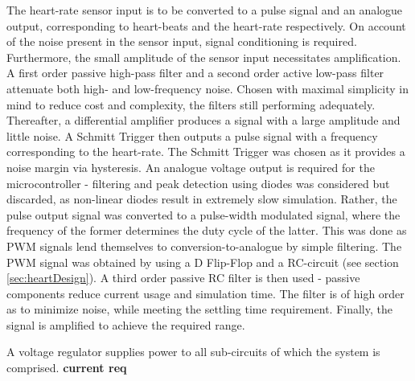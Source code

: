 
The heart-rate sensor input is to be converted to a pulse signal and an analogue output, corresponding to heart-beats and the heart-rate respectively. On account of the noise present in the sensor input, signal conditioning  is required. Furthermore, the small amplitude of the sensor input necessitates amplification. A first order passive high-pass filter and a second order active low-pass filter attenuate both high- and low-frequency noise. Chosen with maximal simplicity in mind to reduce cost and complexity, the filters still performing adequately. Thereafter, a differential amplifier produces a signal with a large amplitude and little noise. A Schmitt Trigger then outputs a pulse signal with a frequency corresponding to the heart-rate. The Schmitt Trigger was chosen as it provides a noise margin via hysteresis. An analogue voltage output is required for the microcontroller - filtering and peak detection using diodes was considered but discarded, as non-linear diodes result in extremely slow simulation. Rather, the pulse output signal was converted to a pulse-width modulated signal, where the frequency of the former determines the duty cycle of the latter. This was done as PWM signals lend themselves to conversion-to-analogue by simple filtering. The PWM signal was obtained by using a D Flip-Flop and a RC-circuit (see section \ref{sec:heartDesign}). A third order passive RC filter is then used - passive components reduce current usage and simulation time. The filter is of high order as to minimize noise, while meeting the settling time requirement. Finally, the signal is amplified to achieve the required range.

A voltage regulator supplies power to all sub-circuits  of which the system is comprised. \textbf{current req}

\vfill









